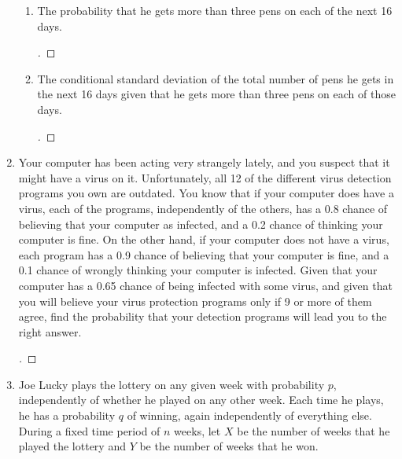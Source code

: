 \documentclass[paper=usletter, fontsize=12pt]{article}
\newenvironment{cproof}{\begin{proof}[\unskip\nopunct]}{\end{proof}}
\begin{document}
\begin{enumerate}
\begin{enumerate}[label=\textbf{\alph*}]
            \item The probability that he gets more than three pens on each of
            the next 16 days.
            \begin{cproof}
            \end{cproof}

            \item The conditional standard deviation of the total number of
            pens he gets in the next 16 days given that he gets more than three
            pens on each of those days.
            \begin{cproof}
            \end{cproof}

        \end{enumerate}

        \item Your computer has been acting very strangely lately, and you
        suspect that it might have a virus on it. Unfortunately, all 12 of the
        different virus detection programs you own are outdated. You know that
        if your computer does have a virus, each of the programs, independently
        of the others, has a 0.8 chance of believing that your computer as
        infected, and a 0.2 chance of thinking your computer is fine. On the
        other hand, if your computer does not have a virus, each program has a
        0.9 chance of believing that your computer is fine, and a 0.1 chance of
        wrongly thinking your computer is infected. Given that your computer
        has a 0.65 chance of being infected with some virus, and given that you
        will believe your virus protection programs only if 9 or more of them
        agree, find the probability that your detection programs will lead you
        to the right answer.
        \begin{cproof}
        \end{cproof}

        \item Joe Lucky plays the lottery on any given week with probability
        $p$, independently of whether he played on any other week. Each time he
        plays, he has a probability $q$ of winning, again independently of
        everything else. During a fixed time period of $n$ weeks, let $X$ be
        the number of weeks that he played the lottery and $Y$ be the number of
        weeks that he won.
        \begin{enumerate}[label=\textbf{\alph*}]


\end{enumerate}
\end{enumerate}
\end{document}
